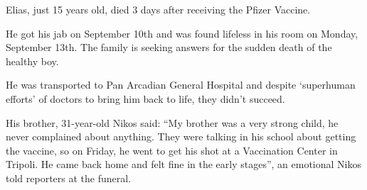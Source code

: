 Elias, just 15 years old, died 3 days after receiving the Pfizer Vaccine.

He got his jab on September 10th and was found lifeless in his room on Monday,
September 13th. The family is seeking answers for the sudden death of the
healthy boy.

He was transported to Pan Arcadian General Hospital and despite ‘superhuman
efforts’ of doctors to bring him back to life, they didn’t succeed.

His brother, 31-year-old Nikos said: “My brother was a very strong child, he
never complained about anything. They were talking in his school about getting
the vaccine, so on Friday, he went to get his shot at a Vaccination Center in
Tripoli. He came back home and felt fine in the early stages”, an emotional
Nikos told reporters at the funeral.

